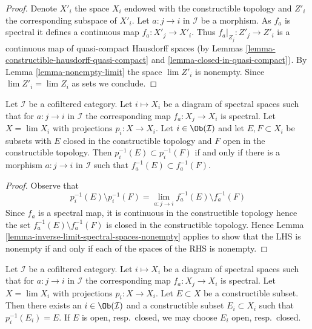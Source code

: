 \begin{proof}
Denote $X'_i$ the space $X_i$ endowed with the constructible topology
and $Z'_i$ the corresponding subspace of $X'_i$.
Let $a : j \to i$ in $\mathcal{I}$ be a morphism. As $f_a$ is spectral
it defines a continuous map $f_a : X'_j \to X'_i$. Thus
$f_a|_{Z_j} : Z'_j \to Z'_i$ is a continuous map of quasi-compact
Hausdorff spaces (by
Lemmas \ref{lemma-constructible-hausdorff-quasi-compact} and
\ref{lemma-closed-in-quasi-compact}). By
Lemma \ref{lemma-nonempty-limit} the space $\lim Z'_i$ is nonempty.
Since $\lim Z'_i = \lim Z_i$ as sets we conclude.
\end{proof}

\begin{lemma}
\label{lemma-inverse-limit-spectral-spaces-equal}
Let $\mathcal{I}$ be a cofiltered category. Let $i \mapsto X_i$ be a diagram
of spectral spaces such that for $a : j \to i$ in $\mathcal{I}$
the corresponding map $f_a : X_j \to X_i$ is spectral. Let $X = \lim X_i$
with projections $p_i : X \to X_i$. Let $i \in \Ob(\mathcal{I})$ and let
$E, F \subset X_i$ be subsets with $E$ closed in the constructible topology
and $F$ open in the constructible topology.
Then $p_i^{-1}(E) \subset p_i^{-1}(F)$ if and only if there is a morphism
$a : j \to i$ in $\mathcal{I}$ such that $f_a^{-1}(E) \subset f_a^{-1}(F)$.
\end{lemma}

\begin{proof}
Observe that
$$
p_i^{-1}(E) \setminus p_i^{-1}(F) =
\lim_{a : j \to i} f_a^{-1}(E) \setminus f_a^{-1}(F)
$$
Since $f_a$ is a spectral map, it is continuous in the constructible topology
hence the set $f_a^{-1}(E) \setminus f_a^{-1}(F)$ is closed in the
constructible topology. Hence
Lemma \ref{lemma-inverse-limit-spectral-spaces-nonempty}
applies to show that the LHS is nonempty if and only if each of the spaces
of the RHS is nonempty.
\end{proof}

\begin{lemma}
\label{lemma-inverse-limit-spectral-spaces-constructible}
Let $\mathcal{I}$ be a cofiltered category. Let $i \mapsto X_i$ be a diagram
of spectral spaces such that for $a : j \to i$ in $\mathcal{I}$
the corresponding map $f_a : X_j \to X_i$ is spectral. Let $X = \lim X_i$
with projections $p_i : X \to X_i$. Let $E \subset X$ be a constructible
subset. Then there exists an $i \in \Ob(\mathcal{I})$ and a constructible
subset $E_i \subset X_i$ such that $p_i^{-1}(E_i) = E$. If $E$ is open,
resp.\ closed, we may choose $E_i$ open, resp.\ closed.
\end{lemma}

